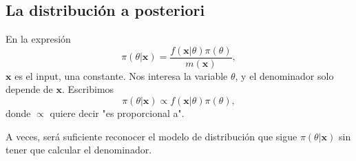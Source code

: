 \subsection{La distribución a posteriori}
En la expresión \[
\pi(\theta|\mathbf{x})=\dfrac{f(\mathbf{x}|\theta)\pi(\theta)}{m(\mathbf{x})},
\] 
$\mathbf{x}$ es el input, una constante. Nos interesa la variable $\theta$, y el denominador solo depende de  $\mathbf{x}$. Escribimos \[
\pi(\theta|\mathbf{x})\propto f(\mathbf{x}|\theta)\pi(\theta),
\] donde $\propto$ quiere decir "es proporcional a".
 \begin{tcolorbox}[colback=olive!5!white, colframe=olive!75!black, title=\textbf{Consejo}]
A veces, será suficiente reconocer el modelo de distribución que sigue $\pi(\theta|\mathbf{x})$ sin tener que calcular el denominador.
\end{tcolorbox}

